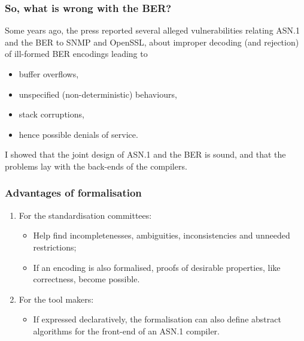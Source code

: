 \documentclass[compress,dvips,xcolor={dvipsnames},t]{beamer}
\newcommand\ASN{\textsf{ASN.1}\xspace}
\begin{document}
\begin{frame}
\frametitle{So, what is wrong with the BER?}

Some years ago, the press reported several alleged vulnerabilities
relating \ASN and the BER to SNMP and OpenSSL, about improper decoding
(and rejection) of ill-formed BER encodings leading to
\begin{itemize}
  \item buffer overflows,

  \item unspecified (non-deterministic) behaviours,

  \item stack corruptions,

  \item hence possible denials of service.

\end{itemize}

I showed that the joint design of \ASN and the BER is sound, and that
the problems lay with the back-ends of the compilers.

\end{frame}

\begin{frame}
\frametitle{Advantages of formalisation}

\begin{enumerate}

  \item For the standardisation committees:
    \begin{itemize}

    \item Help find incompletenesses, ambiguities, inconsistencies and
      unneeded restrictions;

    \item If an encoding is also formalised, proofs of desirable
      properties, like correctness, become possible.

    \end{itemize}

  \item For the tool makers:
    \begin{itemize}

      \item If expressed declaratively, the formalisation can also
        define abstract algorithms for the front-end of an \ASN
        compiler.

    \end{itemize}

\end{enumerate}

\end{frame}
\end{document}
